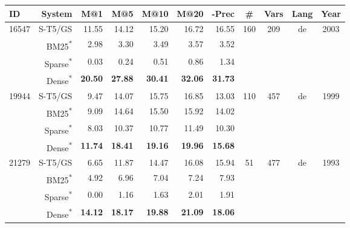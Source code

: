 \documentclass[11pt]{article}
\begin{document}
\begin{table*}[]
    \centering
    \begin{tabular}{l|r|r|r|r|r|r|c|c|c|c}
     ID &  System &  M@1 &  M@5 &  M@10 &  M@20 &  -Prec &  \# & Vars & Lang &  Year \\
    \hline
    \hline
    \multirow{4}{3em}{16547} &    S-T5/GS &  11.55 &  14.12 &   15.20 &   16.72 &        16.55 &      \multirow{4}{2em}{160} &    \multirow{4}{1em}{209} &        \multirow{4}{1em}{de} &           \multirow{4}{2em}{2003} \\
     &    BM25\textsuperscript{*} &   2.98 &   3.30 &    3.49 &    3.57 &         3.52 &       &     &         &           \\
     &    Sparse\textsuperscript{*} &   0.03 &   0.24 &    0.51 &    0.86 &         1.34 &       &     &         &             \\
     &    Dense\textsuperscript{*} &  \textbf{20.50} &  \textbf{27.88} &   \textbf{30.41} &   \textbf{32.06} &        \textbf{31.73} &       &             &           \\
    \hline
    \multirow{4}{3em}{19944} &    S-T5/GS &   9.47 &  14.07 &   15.75 &   16.85 &        13.03 &      \multirow{4}{2em}{110} &    \multirow{4}{1em}{457} &        \multirow{4}{1em}{de} &            \multirow{4}{2em}{1999} \\
     &    BM25\textsuperscript{*} &   9.09 &  14.64 &   15.50 &   15.92 &        14.02 &       &     &         &           \\
     &    Sparse\textsuperscript{*} &   8.03 &  10.37 &   10.77 &   11.49 &        10.30 &       &     &         &           \\
     &    Dense\textsuperscript{*} &  \textbf{11.74} &  \textbf{18.41} &   \textbf{19.16} &   \textbf{19.96} &        \textbf{15.68} &       &     &         &           \\
    \hline
    \multirow{4}{3em}{21279} &    S-T5/GS &   6.65 &  11.87 &   14.47 &   16.08 &        15.94 &       \multirow{4}{2em}{51} &    \multirow{4}{1em}{477} &        \multirow{4}{1em}{de} &            \multirow{4}{2em}{1993} \\
     &    BM25\textsuperscript{*} &   4.92 &   6.96 &    7.04 &    7.24 &         7.93 &        &     &         &           \\
     &    Sparse\textsuperscript{*} &   0.00 &   1.16 &    1.63 &    2.01 &         1.91 &        &     &         &           \\
     &    Dense\textsuperscript{*} &  \textbf{14.12} &  \textbf{18.17} &   \textbf{19.88} &   \textbf{21.09} &        \textbf{18.06} &        &     &         &           \\

\end{tabular}
\end{table*}
\end{document}
